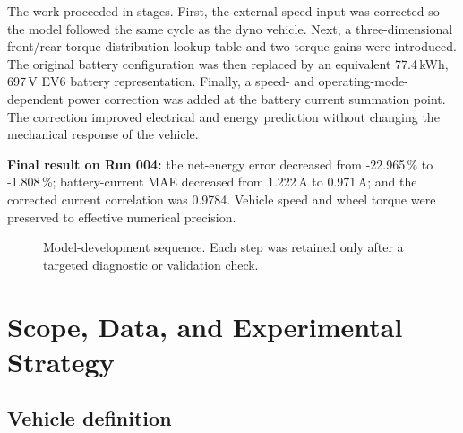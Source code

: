 \documentclass[11pt,letterpaper]{article}
\newcommand{\SI}[2]{#1\,#2}
\newcommand{\percent}{\%}
\begin{document}
The work proceeded in stages. First, the external speed input was corrected so
the model followed the same cycle as the dyno vehicle. Next, a three-dimensional
front/rear torque-distribution lookup table and two torque gains were introduced.
The original battery configuration was then replaced by an equivalent
\SI{77.4}{kWh}, \SI{697}{V} EV6 battery representation. Finally, a
speed- and operating-mode-dependent power correction was added at the battery
current summation point. The correction improved electrical and energy
prediction without changing the mechanical response of the vehicle.

\begin{keybox}
\textbf{Final result on Run 004:} the net-energy error decreased from
\SI{-22.965}{\percent} to \SI{-1.808}{\percent}; battery-current MAE decreased
from \SI{1.222}{A} to \SI{0.971}{A}; and the corrected current correlation was
0.9784. Vehicle speed and wheel torque were preserved to effective numerical
precision.
\end{keybox}

\begin{figure}[H]
\centering
{}
\caption{Model-development sequence. Each step was retained only after a targeted diagnostic or validation check.}
\end{figure}

\section{Scope, Data, and Experimental Strategy}

\subsection{Vehicle definition}
\end{document}
